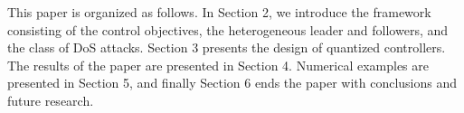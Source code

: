 \documentclass{autart}
\begin{document}




















This paper is organized as follows. In Section 2, we introduce the framework consisting of the control objectives, the heterogeneous leader and followers, and the class of DoS attacks. Section 3 presents the design of quantized controllers. The results of the paper are presented in Section 4. 
Numerical examples are presented in Section 5, and finally Section 6 ends the paper with conclusions and future research.
\end{document}
